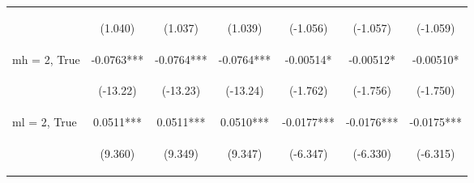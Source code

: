 \documentclass[]{standalone}
\begin{document}
\begin{tabular}{lcccccc}
    \vspace{4pt}     & \begin{footnotesize}(1.040)\end{footnotesize}  & \begin{footnotesize}(1.037)\end{footnotesize}  & \begin{footnotesize}(1.039)\end{footnotesize}  & \begin{footnotesize}(-1.056)\end{footnotesize} & \begin{footnotesize}(-1.057)\end{footnotesize} & \begin{footnotesize}(-1.059)\end{footnotesize} \\
    mh = 2, True     & -0.0763***                                     & -0.0764***                                     & -0.0764***                                     & -0.00514*                                      & -0.00512*                                      & -0.00510*                                      \\
    \vspace{4pt}     & \begin{footnotesize}(-13.22)\end{footnotesize} & \begin{footnotesize}(-13.23)\end{footnotesize} & \begin{footnotesize}(-13.24)\end{footnotesize} & \begin{footnotesize}(-1.762)\end{footnotesize} & \begin{footnotesize}(-1.756)\end{footnotesize} & \begin{footnotesize}(-1.750)\end{footnotesize} \\
    ml = 2, True     & 0.0511***                                      & 0.0511***                                      & 0.0510***                                      & -0.0177***                                     & -0.0176***                                     & -0.0175***                                     \\
    \vspace{4pt}     & \begin{footnotesize}(9.360)\end{footnotesize}  & \begin{footnotesize}(9.349)\end{footnotesize}  & \begin{footnotesize}(9.347)\end{footnotesize}  & \begin{footnotesize}(-6.347)\end{footnotesize} & \begin{footnotesize}(-6.330)\end{footnotesize} & \begin{footnotesize}(-6.315)\end{footnotesize} \\

\end{tabular}
\end{document}
